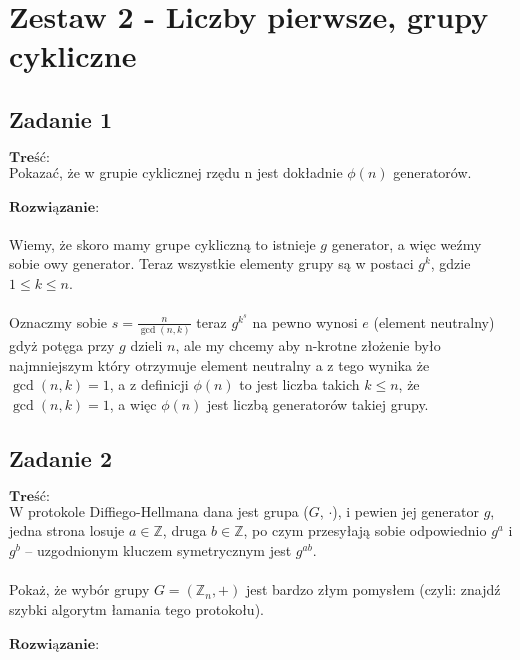 \section{Zestaw 2 - Liczby pierwsze, grupy cykliczne}
\subsection{Zadanie 1}
$\textbf{Treść:}$  \\ \newline
Pokazać, że w grupie cyklicznej rzędu n jest dokładnie $\phi(n)$ generatorów.
\\
\\
$\textbf{Rozwiązanie:}$ \\
\\
Wiemy, że skoro mamy grupe cykliczną to istnieje $g$ generator, a więc weźmy sobie owy generator. Teraz wszystkie elementy grupy są w postaci $g^{k}$, gdzie $1 \leq k \leq n$.
\\
\\
 Oznaczmy sobie $s = \frac{n}{\gcd(n,k)}$ teraz $g^{k^{s}}$ na pewno wynosi $e$ (element neutralny) gdyż potęga przy $g$ dzieli $n$, ale my chcemy aby n-krotne złożenie było najmniejszym który otrzymuje element neutralny a z tego wynika że $\gcd(n,k) = 1$, a z definicji $\phi(n)$ to jest liczba takich $k \leq n$, że $\gcd(n,k) = 1$, a więc $\phi(n)$ jest liczbą generatorów takiej grupy.\\ 



\subsection{Zadanie 2}
$\textbf{Treść:}$ \\ \newline
W protokole Diffiego-Hellmana dana jest grupa ($G$, $\cdot$), i pewien jej generator
$g$, jedna strona losuje $a \in \mathbb{Z}$, druga $b \in \mathbb{Z}$, po czym przesyłają sobie odpowiednio $g^{a}$
i $g^{b}$ – uzgodnionym kluczem symetrycznym jest $g^{ab}$.
\\
\\
 Pokaż, że wybór grupy $G = (\mathbb{Z}_{n}, +)$ jest bardzo złym pomysłem (czyli: znajdź szybki algorytm łamania tego protokołu).
 \\
 \\
 $\textbf{Rozwiązanie:}$ \\


